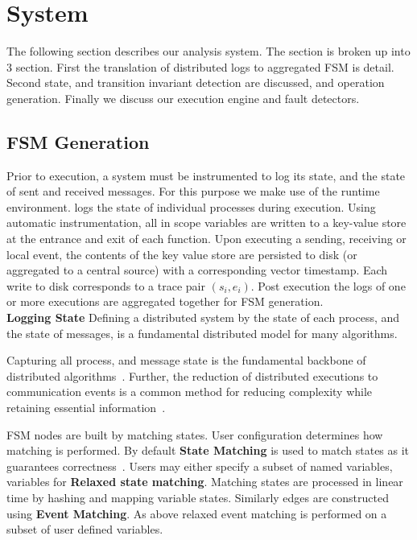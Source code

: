 \section{System}
\label{sec:system}

The following section describes our analysis system. The section is broken up
into 3 section. First the translation of distributed logs to aggregated FSM is
detail. Second state, and transition invariant detection are discussed, and
operation generation. Finally we discuss our execution engine and fault
detectors.

\subsection{FSM Generation}

Prior to execution, a system must be instrumented to log its state, and the
state of sent and received messages. For this purpose we make use of the \dinv
runtime environment. \dinv logs the state of individual processes during
execution. Using automatic instrumentation, all in scope variables are written
to a key-value store at the entrance and exit of each function. Upon executing
a sending, receiving or local event, the contents of the key value store are
persisted to disk (or aggregated to a central source) with a corresponding
vector timestamp. Each write to disk corresponds to a trace pair $(s_i,e_i)$.
Post execution the logs of one or more executions are aggregated together for
FSM generation. \\

\noindent\textbf{Logging State} Defining a distributed system by the state of
each process, and the state of messages, is a fundamental distributed model for
many algorithms.

Capturing all process, and message state is the fundamental backbone of
distributed algorithms~\cite{mattern_vector_clocks_1989,MATTERN1993423}.
Further, the reduction of distributed executions to communication events is a
common method for reducing complexity while retaining essential
information~\cite{Fromentin:1995:OAD:213523.213533,BABAOGLU1995173,5727765,Hurfin:1998:EDD:286181.286G191,FROMENTIN1997522}.

FSM nodes are built by matching states. User
configuration determines how matching is performed. By default \textbf{State
Matching} is used to match states as it guarantees
correctness~\cite{Garg:2014:MAS:2580115.2580404}. Users may either specify a
subset of named variables, variables for \textbf{Relaxed state matching}.
Matching states are processed in linear time by hashing and mapping variable
states. Similarly edges are constructed using \textbf{Event Matching}. As above
relaxed event matching is performed on a subset of user defined variables.

